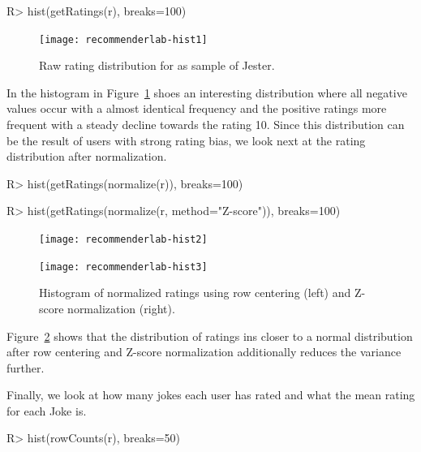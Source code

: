 \documentclass[nojss]{jss}
\begin{document}
\begin{Schunk}
\begin{Sinput}
R> hist(getRatings(r), breaks=100)
\end{Sinput}
\end{Schunk}
\begin{figure}
\centerline{\texttt{[image: recommenderlab-hist1]}}
\caption{Raw rating distribution for as sample of Jester.} 
\label{fig:hist1}
\end{figure}

In the histogram in Figure~\ref{fig:hist1} 
shoes an interesting distribution
where all negative values occur with a almost identical frequency and
the positive ratings more frequent with a steady decline towards the 
rating 10. Since this distribution can be the result of users with strong
rating bias, we look next at the rating distribution after normalization.

\begin{Schunk}
\begin{Sinput}
R> hist(getRatings(normalize(r)), breaks=100)
\end{Sinput}
\end{Schunk}
\begin{Schunk}
\begin{Sinput}
R> hist(getRatings(normalize(r, method="Z-score")), breaks=100)
\end{Sinput}
\end{Schunk}

\begin{figure}
\begin{minipage}[b]{.48\linewidth}
\centerline{\texttt{[image: recommenderlab-hist2]}}
\end{minipage}
\begin{minipage}[b]{.48\linewidth}
\centerline{\texttt{[image: recommenderlab-hist3]}}
\end{minipage}
\caption{Histogram of normalized ratings using row centering (left) and 
Z-score normalization (right).}
\label{fig:hist2}
\end{figure}

Figure~\ref{fig:hist2} shows that the distribution of ratings
ins closer to a normal distribution after row centering and 
Z-score normalization additionally reduces the variance further.

Finally, we look at how many jokes each user has rated and what the 
mean rating for each Joke is.

\begin{Schunk}
\begin{Sinput}
R> hist(rowCounts(r), breaks=50)
\end{Sinput}
\end{Schunk}
\end{document}
